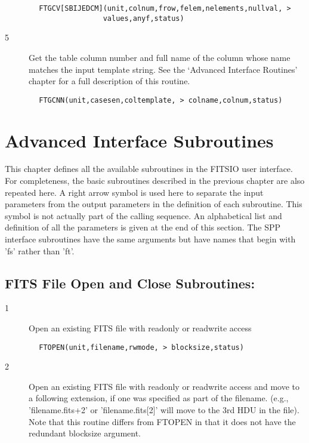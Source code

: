 \documentclass[11pt]{book}
\begin{document}
\begin{verbatim}
        FTGCV[SBIJEDCM](unit,colnum,frow,felem,nelements,nullval, >
                       values,anyf,status)
\end{verbatim}

\begin{description}
\item[5 ] Get the table column number and full name of the column whose name
    matches the input template string.  See the `Advanced Interface Routines'
   chapter for a full description of this routine.
\end{description}

\begin{verbatim}
        FTGCNN(unit,casesen,coltemplate, > colname,colnum,status)
\end{verbatim}


\chapter{   Advanced Interface Subroutines }

This chapter defines all the available subroutines in the FITSIO user
interface. For completeness, the basic subroutines described in the
previous chapter are also repeated here. A right arrow symbol is used
here to separate the input parameters from the output parameters in the
definition of each subroutine. This symbol is not actually part of the
calling sequence. An alphabetical list and definition of all the
parameters is given at the end of this section. The SPP interface
subroutines have the same arguments but have names that begin with 'fs'
rather than 'ft'.


\section{FITS File Open and Close Subroutines: \label{FTOPEN}}


\begin{description}
\item[1 ]Open an existing FITS file with readonly or readwrite access
\end{description}

\begin{verbatim}
        FTOPEN(unit,filename,rwmode, > blocksize,status)
\end{verbatim}

\begin{description}
\item[2 ]Open an existing FITS file with readonly or readwrite access
   and move to a following extension, if one was specified as
   part of the filename.  (e.g.,  'filename.fits+2' or
   'filename.fits[2]' will move to the 3rd HDU in the file).
   Note that this routine differs from FTOPEN in that it does not
  have the redundant blocksize argument.
\end{description}
\end{document}
